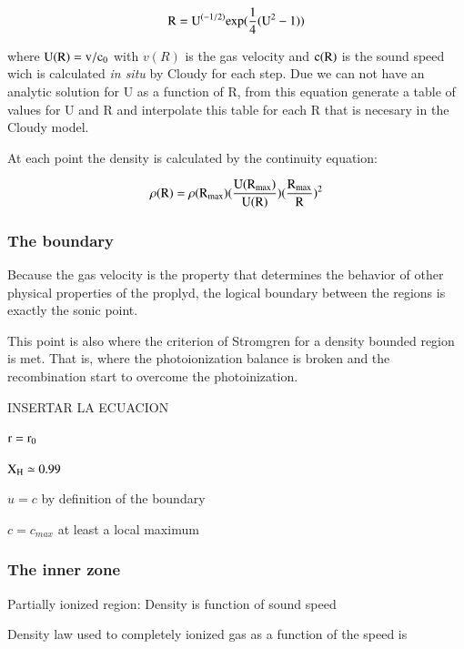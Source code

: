 \documentclass[aaspp]{article}
\begin{document}
\begin{equation}
  \rm R = U^{(-1/2)} exp (\frac{1}{4} (U^2 -1))
\end{equation}

where $\rm U(R) = v / c_0$ with $v(R)$ is the gas velocity and
$\rm c(R)$ is the sound speed wich is calculated {\it in situ} by Cloudy
for each step.
Due we can not have an analytic solution for U as a function of R,
from this equation generate a table of values for U and R and
interpolate this table for each R that is necesary in the Cloudy model.

At each point the density is calculated by the continuity equation:

\begin{equation}
  \rm \rho (R) = \rho (R_{max}) (\frac{U(R_{max})}{U (R)}) (\frac{R_{max}}{R})^2
\end{equation}

\subsubsection{The boundary}
\label{sec:boundary}

Because the gas velocity is the property that determines the behavior
of other physical properties of the proplyd, the logical boundary
between the regions is exactly the sonic point.

This point is also where the criterion of Stromgren for a density
bounded region is met. That is, where the photoionization balance is
broken and the recombination start to overcome the photoinization.

INSERTAR LA ECUACION

$\rm r = r_0$

$\rm X_H \simeq 0.99$

$u = c$ by definition of the boundary

$c = c_{max}$ at least a local maximum 

\subsubsection{The inner zone}
\label{sec:inner}

Partially ionized region: Density is function of sound speed

Density law used to completely ionized gas as a function of the speed is
\end{document}
